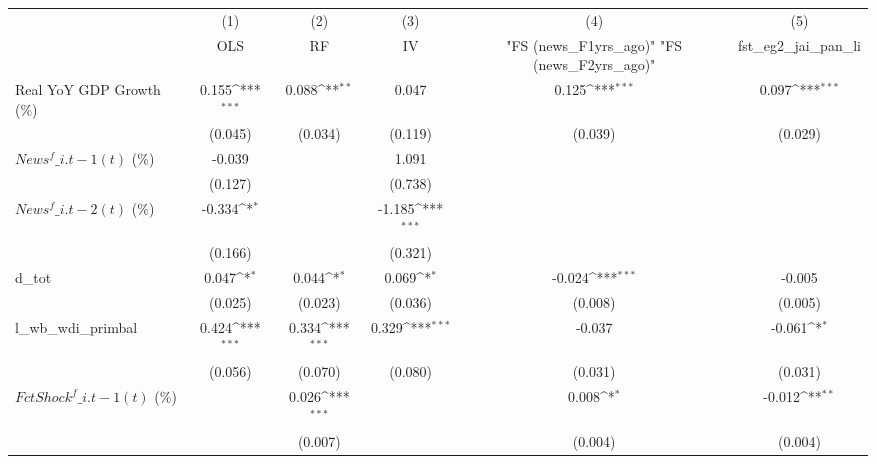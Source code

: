 {
\def\sym#1{\ifmmode^{#1}\else\(^{#1}\)\fi}
\begin{tabular}{l*{5}{c}}
\toprule
                    &\multicolumn{1}{c}{(1)}&\multicolumn{1}{c}{(2)}&\multicolumn{1}{c}{(3)}&\multicolumn{1}{c}{(4)}&\multicolumn{1}{c}{(5)}\\
                    &\multicolumn{1}{c}{OLS}&\multicolumn{1}{c}{RF}&\multicolumn{1}{c}{IV}&\multicolumn{1}{c}{ "FS (news\_F1yrs\_ago)"  "FS (news\_F2yrs\_ago)" }&\multicolumn{1}{c}{fst\_eg2\_jai\_pan\_li}\\
\midrule
Real YoY GDP Growth (\%)&       0.155\sym{***}&       0.088\sym{**} &       0.047         &       0.125\sym{***}&       0.097\sym{***}\\
                    &     (0.045)         &     (0.034)         &     (0.119)         &     (0.039)         &     (0.029)         \\
\addlinespace
$ News^f\_{i.t-1}(t)$ (\%)&      -0.039         &                     &       1.091         &                     &                     \\
                    &     (0.127)         &                     &     (0.738)         &                     &                     \\
\addlinespace
$ News^f\_{i.t-2}(t)$ (\%)&      -0.334\sym{*}  &                     &      -1.185\sym{***}&                     &                     \\
                    &     (0.166)         &                     &     (0.321)         &                     &                     \\
\addlinespace
d\_tot               &       0.047\sym{*}  &       0.044\sym{*}  &       0.069\sym{*}  &      -0.024\sym{***}&      -0.005         \\
                    &     (0.025)         &     (0.023)         &     (0.036)         &     (0.008)         &     (0.005)         \\
\addlinespace
l\_wb\_wdi\_primbal    &       0.424\sym{***}&       0.334\sym{***}&       0.329\sym{***}&      -0.037         &      -0.061\sym{*}  \\
                    &     (0.056)         &     (0.070)         &     (0.080)         &     (0.031)         &     (0.031)         \\
\addlinespace
$ FctShock^f\_{i.t-1}(t)$ (\%)&                     &       0.026\sym{***}&                     &       0.008\sym{*}  &      -0.012\sym{**} \\
                    &                     &     (0.007)         &                     &     (0.004)         &     (0.004)         \\

\end{tabular}}
